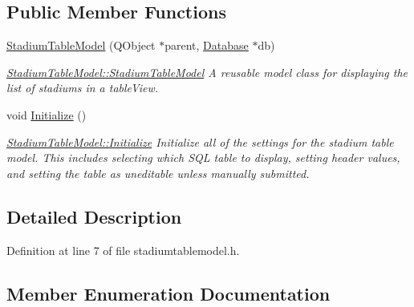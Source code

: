 \subsection*{Public Member Functions}
\begin{DoxyCompactItemize}
\item 
\hyperlink{class_stadium_table_model_afef158fb1fee5aab9902048db5a69bf2}{Stadium\+Table\+Model} (Q\+Object $\ast$parent, \hyperlink{class_database}{Database} $\ast$db)
\begin{DoxyCompactList}\small\item\em \hyperlink{class_stadium_table_model_afef158fb1fee5aab9902048db5a69bf2}{Stadium\+Table\+Model\+::\+Stadium\+Table\+Model} A reusable model class for displaying the list of stadiums in a table\+View. \end{DoxyCompactList}\item 
void \hyperlink{class_stadium_table_model_acf30d2a9c04b9691bbe15056c0804423}{Initialize} ()
\begin{DoxyCompactList}\small\item\em \hyperlink{class_stadium_table_model_acf30d2a9c04b9691bbe15056c0804423}{Stadium\+Table\+Model\+::\+Initialize} Initialize all of the settings for the stadium table model. This includes selecting which S\+QL table to display, setting header values, and setting the table as uneditable unless manually submitted. \end{DoxyCompactList}\end{DoxyCompactItemize}


\subsection{Detailed Description}


Definition at line 7 of file stadiumtablemodel.\+h.



\subsection{Member Enumeration Documentation}
